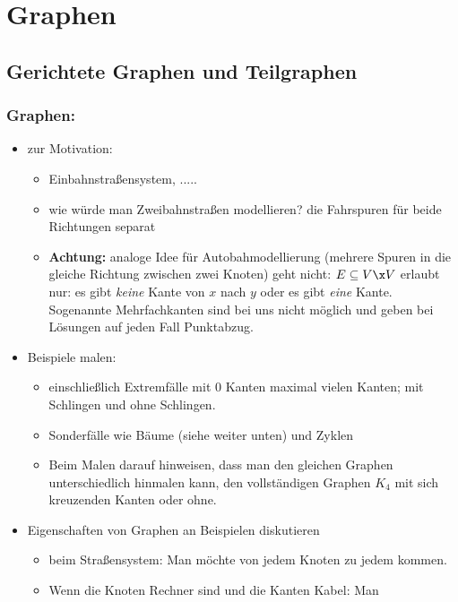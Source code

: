\documentclass[12pt]{article}
\theoremstyle{margin}
\theoremstyle{margin}
\begin{document}


\setcounter{section}{6}

\section{Graphen}
\subsection{Gerichtete Graphen und Teilgraphen}

\subsubsection{Graphen:}
  \begin{itemize}
  \item zur Motivation:
    \begin{itemize}
    \item Einbahnstraßensystem, .....
    \item wie würde man Zweibahnstraßen modellieren? die Fahrspuren
      für beide Richtungen separat
    \item \textbf{Achtung:} analoge Idee für Autobahmodellierung
      (mehrere Spuren in die gleiche Richtung zwischen zwei Knoten)
      geht nicht: $E\subseteq V\x V$ erlaubt nur: es gibt \emph{keine}
      Kante von $x$ nach $y$ oder es gibt \emph{eine}
      Kante. Sogenannte Mehrfachkanten sind bei uns nicht möglich und 
     geben bei Lösungen auf jeden Fall Punktabzug.
    \end{itemize}
  \item Beispiele malen:
    \begin{itemize}
    \item einschließlich Extremfälle mit $0$ Kanten \bzw maximal vielen
      Kanten; mit Schlingen und ohne Schlingen.
    \item Sonderfälle wie Bäume (siehe weiter unten) und Zyklen
    \item Beim Malen darauf hinweisen, dass man den gleichen Graphen
      unterschiedlich hinmalen kann, \zB den vollständigen Graphen $K_4$ mit sich kreuzenden
      Kanten oder ohne.
    \end{itemize}
  \item Eigenschaften von Graphen an Beispielen diskutieren
    \begin{itemize}
    \item beim Straßensystem: Man möchte von jedem Knoten zu jedem
      kommen.
    \item Wenn die Knoten Rechner sind und die Kanten Kabel: Man

\end{itemize}
\end{itemize}
\end{document}
